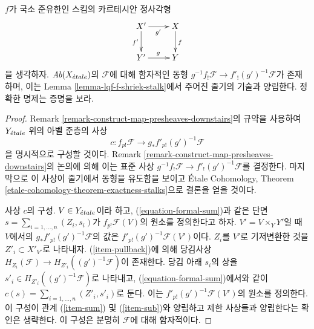 \begin{lemma}
\label{lemma-lqf-base-change-f-shriek}
$f$가 국소 준유한인 스킴의 카르테시안 정사각형
$$
\xymatrix{
X' \ar[r]_{g'} \ar[d]_{f'} & X \ar[d]^f \\
Y' \ar[r]^g & Y
}
$$
을 생각하자. $\textit{Ab}(X_{\acute{e}tale})$의 $\mathcal{F}$에 대해 함자적인
동형 $g^{-1}f_!\mathcal{F} \to f'_!(g')^{-1}\mathcal{F}$가 존재하며,
이는 Lemma \ref{lemma-lqf-f-shriek-stalk}에서 주어진 줄기의 기술과
양립한다. 정확한 명제는 증명을 보라.
\end{lemma}

\begin{proof}
Remark \ref{remark-construct-map-presheaves-downstairs}의 규약을 사용하여
$Y_{\acute{e}tale}$ 위의 아벨 준층의 사상
$$
c : f_{p!}\mathcal{F} \longrightarrow g_*f'_{p!}(g')^{-1}\mathcal{F}
$$
을 명시적으로 구성할 것이다. Remark
\ref{remark-construct-map-presheaves-downstairs}의 논의에 의해 이는
표준 사상 $g^{-1}f_!\mathcal{F} \to f'_!(g')^{-1}\mathcal{F}$를
결정한다. 마지막으로 이 사상이 줄기에서 동형을 유도함을 보이고
\'Etale Cohomology, Theorem
\ref{etale-cohomology-theorem-exactness-stalks}으로 결론을 얻을 것이다.

\medskip\noindent
사상 $c$의 구성. $V \in Y_{\acute{e}tale}$이라 하고,
(\ref{equation-formal-sum})과 같은 단면
$s = \sum_{i = 1, \ldots, n} (Z_i, s_i)$가
$f_{p!}\mathcal{F}(V)$의 원소를 정의한다고 하자.
$V' = V \times_Y Y'$일 때 $V$에서의
$g_*f'_{p!}(g')^{-1}\mathcal{F}$의 값은
$f'_{p!}(g')^{-1}\mathcal{F}(V')$이다.
$Z_i$를 $V'$로 기저변환한 것을 $Z'_i \subset X'_{V'}$로 나타내자.
(\ref{item-pullback})에 의해 당김사상
$H_{Z_i}(\mathcal{F}) \to H_{Z'_i}((g')^{-1}\mathcal{F})$이 존재한다.
당김 아래 $s_i$의 상을
$s'_i \in H_{Z'_i}((g')^{-1}\mathcal{F})$로 나타내고,
(\ref{equation-formal-sum})에서와 같이
$c(s) = \sum_{i = 1, \ldots, n} (Z'_i, s'_i)$로 둔다. 이는
$f'_{p!}(g')^{-1}\mathcal{F}(V')$의 원소를 정의한다. 이 구성이 관계
(\ref{item-sum}) 및 (\ref{item-sub})와 양립하고 제한 사상들과
양립한다는 확인은 생략한다. 이 구성은 분명히 $\mathcal{F}$에 대해
함자적이다.


\end{proof}
